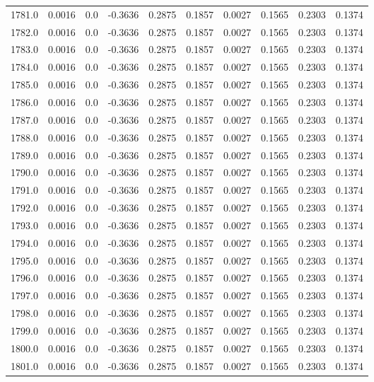 \begin{longtable}{lrrrrrrrrr}
1781.0 & 0.0016 & 0.0 & -0.3636 & 0.2875 & 0.1857 & 0.0027 & 0.1565 & 0.2303 & 0.1374 \\
1782.0 & 0.0016 & 0.0 & -0.3636 & 0.2875 & 0.1857 & 0.0027 & 0.1565 & 0.2303 & 0.1374 \\
1783.0 & 0.0016 & 0.0 & -0.3636 & 0.2875 & 0.1857 & 0.0027 & 0.1565 & 0.2303 & 0.1374 \\
1784.0 & 0.0016 & 0.0 & -0.3636 & 0.2875 & 0.1857 & 0.0027 & 0.1565 & 0.2303 & 0.1374 \\
1785.0 & 0.0016 & 0.0 & -0.3636 & 0.2875 & 0.1857 & 0.0027 & 0.1565 & 0.2303 & 0.1374 \\
1786.0 & 0.0016 & 0.0 & -0.3636 & 0.2875 & 0.1857 & 0.0027 & 0.1565 & 0.2303 & 0.1374 \\
1787.0 & 0.0016 & 0.0 & -0.3636 & 0.2875 & 0.1857 & 0.0027 & 0.1565 & 0.2303 & 0.1374 \\
1788.0 & 0.0016 & 0.0 & -0.3636 & 0.2875 & 0.1857 & 0.0027 & 0.1565 & 0.2303 & 0.1374 \\
1789.0 & 0.0016 & 0.0 & -0.3636 & 0.2875 & 0.1857 & 0.0027 & 0.1565 & 0.2303 & 0.1374 \\
1790.0 & 0.0016 & 0.0 & -0.3636 & 0.2875 & 0.1857 & 0.0027 & 0.1565 & 0.2303 & 0.1374 \\
1791.0 & 0.0016 & 0.0 & -0.3636 & 0.2875 & 0.1857 & 0.0027 & 0.1565 & 0.2303 & 0.1374 \\
1792.0 & 0.0016 & 0.0 & -0.3636 & 0.2875 & 0.1857 & 0.0027 & 0.1565 & 0.2303 & 0.1374 \\
1793.0 & 0.0016 & 0.0 & -0.3636 & 0.2875 & 0.1857 & 0.0027 & 0.1565 & 0.2303 & 0.1374 \\
1794.0 & 0.0016 & 0.0 & -0.3636 & 0.2875 & 0.1857 & 0.0027 & 0.1565 & 0.2303 & 0.1374 \\
1795.0 & 0.0016 & 0.0 & -0.3636 & 0.2875 & 0.1857 & 0.0027 & 0.1565 & 0.2303 & 0.1374 \\
1796.0 & 0.0016 & 0.0 & -0.3636 & 0.2875 & 0.1857 & 0.0027 & 0.1565 & 0.2303 & 0.1374 \\
1797.0 & 0.0016 & 0.0 & -0.3636 & 0.2875 & 0.1857 & 0.0027 & 0.1565 & 0.2303 & 0.1374 \\
1798.0 & 0.0016 & 0.0 & -0.3636 & 0.2875 & 0.1857 & 0.0027 & 0.1565 & 0.2303 & 0.1374 \\
1799.0 & 0.0016 & 0.0 & -0.3636 & 0.2875 & 0.1857 & 0.0027 & 0.1565 & 0.2303 & 0.1374 \\
1800.0 & 0.0016 & 0.0 & -0.3636 & 0.2875 & 0.1857 & 0.0027 & 0.1565 & 0.2303 & 0.1374 \\
1801.0 & 0.0016 & 0.0 & -0.3636 & 0.2875 & 0.1857 & 0.0027 & 0.1565 & 0.2303 & 0.1374 \\

\end{longtable}
